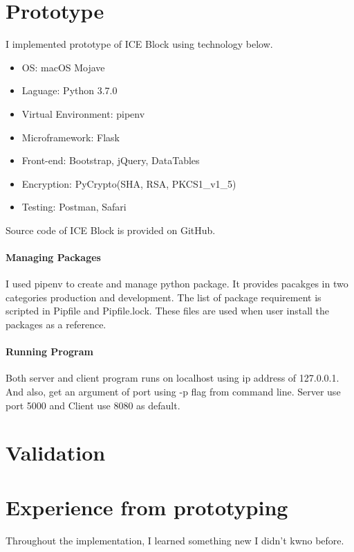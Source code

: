 \documentclass[conference]{IEEEtran}
\begin{document}
\section{Prototype}
I implemented prototype of ICE Block using technology below.

\begin{itemize}
    \item OS: macOS Mojave
    \item Laguage: Python 3.7.0
    \item Virtual Environment: pipenv
    \item Microframework: Flask
    \item Front-end: Bootstrap, jQuery, DataTables
    \item Encryption: PyCrypto(SHA, RSA, PKCS1\_v1\_5)
    \item Testing: Postman, Safari
\end{itemize}

Source code of ICE Block is provided on GitHub.\cite{r3}

\paragraph{Managing Packages}
I used pipenv to create and manage python package.
It provides pacakges in two categories production and development.
The list of package requirement is scripted in Pipfile and Pipfile.lock.
These files are used when user install the packages as a reference.  

\paragraph{Running Program}
Both server and client program runs on localhost using ip address of 127.0.0.1.
And also, get an argument of port using -p flag from command line.
Server use port 5000 and Client use 8080 as default.


\section{Validation}

\subsection{}

\section{Experience from prototyping}
Throughout the implementation, I learned something new I didn't kwno before.
\end{document}
